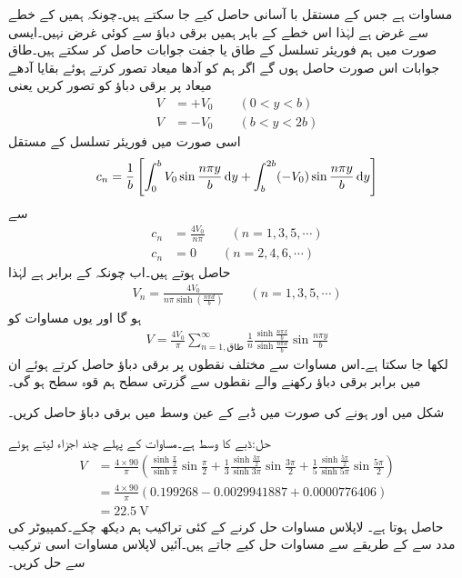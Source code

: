 مساوات   ہے جس کے مستقل با آسانی حاصل کیے جا سکتے ہیں۔چونکہ ہمیں  کے خطے سے غرض ہے لہٰذا اس خطے کے باہر ہمیں برقی دباؤ سے کوئی غرض نہیں۔ایسی صورت میں ہم فوریئر تسلسل کے طاق یا جفت جوابات حاصل کر سکتے ہیں۔طاق جوابات اس صورت حاصل ہوں گے اگر ہم  کو آدھا میعاد تصور کرتے ہوئے بقایا آدھے میعاد  پر برقی دباؤ کو  تصور کریں یعنی  
\begin{align*}
V&=+V_0 \quad \quad (0<y<b)\\
V&=-V_0 \quad \quad (b<y<2b)
\end{align*}
اسی صورت میں فوریئر تسلسل کے مستقل
\begin{align*}
c_n=\frac{1}{b}\left[\int_{0}^{b} V_0 \sin \frac{n\pi y}{b} \dif y +\int_{b}^{2b} (-V_0) \sin \frac{n\pi y}{b} \dif y \right]
\end{align*}
سے
\begin{align*}
c_n&=\frac{4V_0}{n\pi} \quad \quad (n=1,3,5,\cdots)\\
c_n&=0 \quad \quad (n=2,4,6,\cdots)
\end{align*}
حاصل ہوتے ہیں۔اب چونکہ  کے برابر ہے لہٰذا
\begin{align*}
V_n=\frac{4V_0}{n \pi \sinh (\tfrac{n \pi d}{b})}  \quad \quad (n=1,3,5,\cdots)
\end{align*}
ہو گا اور یوں مساوات  کو
\begin{align}\label{مساوات_لاپلاس_طاقتی_تسلسل_مساوات}
V=\frac{4V_0}{\pi} \sum_{n=1,\text{طاق}}^{\infty} \frac{1}{n} \frac{\sinh \frac{n\pi x}{b}}{\sinh \tfrac{n\pi d}{b}} \sin \frac{n\pi y}{b}
\end{align}
لکھا جا سکتا ہے۔اس مساوات سے مختلف نقطوں پر برقی دباؤ  حاصل کرتے ہوئے  ان میں برابر برقی دباؤ رکھنے والے نقطوں سے گزرتی سطح ہم قوہ سطح ہو گی۔

شکل  میں  اور  ہونے کی صورت میں ڈبے کے عین وسط میں برقی دباؤ حاصل کریں۔

حل:ڈبے کا وسط  ہے۔مساوات  کے پہلے چند اجزاء لیتے ہوئے
\begin{align*}
V&=\frac{4\times 90}{\pi} \left( \frac{\sinh \frac{\pi}{2}}{\sinh \pi} \sin \frac{\pi}{2}+\frac{1}{3}  \frac{\sinh \frac{3\pi}{2}}{\sinh 3\pi} \sin \frac{3\pi}{2}+\frac{1}{5}  \frac{\sinh \frac{5\pi}{2}}{\sinh 5\pi} \sin \frac{5\pi}{2}\right)\\
&=\frac{4\times 90}{\pi} \left(0.199268-0.0029941887+0.0000776406 \right)\\
&=\SI{22.5}{\volt}
\end{align*}
حاصل ہوتا ہے۔
لاپلاس مساوات حل کرنے کے کئی تراکیب ہم دیکھ چکے۔کمپیوٹر کی مدد سے  کے طریقے سے مساوات حل کیے جاتے ہیں۔آئیں لاپلاس مساوات اسی ترکیب سے حل کریں۔
  
